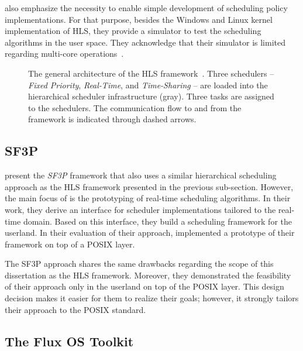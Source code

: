  also emphasize the necessity to enable simple development of scheduling policy implementations. For that purpose, besides the Windows and Linux kernel implementation of HLS, they provide a simulator to test the scheduling algorithms in the user space. They acknowledge that their simulator is limited regarding multi-core operations~\cite[4]{Abeni-2002-HLS}.

\begin{figure}[t!]\centering
	\caption[The general architecture of the HLS framework.]{The general architecture of the HLS framework~\cite[35]{Regehr-2001-HLSPhD}. Three schedulers -- \emph{Fixed Priority}, \emph{Real-Time}, and \emph{Time-Sharing} -- are loaded into the hierarchical scheduler infrastructure (gray). Three tasks are assigned to the schedulers. The communication flow to and from the framework is indicated through dashed arrows.}%
	\label{fig:related:hls-arch}
\end{figure}

\subsection{SF3P}

\Textcite{Gomez-2014-SF3P} present the \emph{SF3P} framework that also uses a similar hierarchical scheduling approach as the HLS framework presented in the previous sub-section. However, the main focus of \citeauthor{Gomez-2014-SF3P} is the prototyping of real-time scheduling algorithms. In their work, they derive an interface for scheduler implementations tailored to the real-time domain. Based on this interface, they build a scheduling framework for the userland. In their evaluation of their approach, \citeauthor{Gomez-2014-SF3P} implemented a prototype of their framework on top of a POSIX layer.

The SF3P approach shares the same drawbacks regarding the scope of this dissertation as the HLS framework. Moreover, they demonstrated the feasibility of their approach only in the userland on top of the POSIX layer. This design decision makes it easier for them to realize their goals; however, it strongly tailors their approach to the POSIX standard.

\subsection{The Flux OS Toolkit}%
\label{sec:rw:fluxos}

